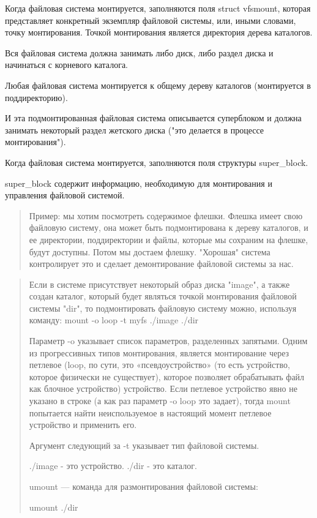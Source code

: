 Когда файловая система монтируется, заполняются поля struct vfsmount, которая представляет конкретный экземпляр файловой системы, или, иными словами, точку монтирования. Точкой монтирования является директория дерева каталогов.

Вся файловая система должна занимать либо диск, либо раздел диска и начинаться с корневого каталога.

Любая файловая система монтируется к общему дереву каталогов (монтируется в поддиректорию).

И эта подмонтированная файловая система описывается суперблоком и должна занимать некоторый раздел жетского диска ("это делается в процессе монтирования").

Когда файловая система монтируется, заполняются поля структуры super\_block.

super\_block содержит информацию, необходимую для монтирования и управления файловой системой.

\begin{quote}
Пример: мы хотим посмотреть содержимое флешки. Флешка имеет свою файловую систему, она может быть подмонтирована к дереву каталогов, и ее директории, поддиректории и файлы, которые мы сохраним на флешке, будут доступны. Потом мы достаем флешку. "Хорошая" система контролирует это и сделает демонтирование файловой системы за нас.
\end{quote}

\begin{quote}
Если в системе присутствует некоторый образ диска "image", а также создан каталог, который будет являться точкой монтирования файловой системы "dir", то подмонтировать файловую систему можно, используя команду: mount -o loop -t myfs ./image ./dir

Параметр -o указывает список параметров, разделенных запятыми. Одним из прогрессивных типов монтирования, является монтирование через петлевое (loop, по сути, это «псевдоустройство» (то есть устройство, которое физически не существует), которое позволяет обрабатывать файл как блочное устройство) устройство. Если петлевое устройство явно не указано в строке (а как раз параметр -o loop это задает), тогда mount попытается найти неиспользуемое в настоящий момент петлевое устройство и применить его.

Аргумент следующий за -t указывает тип файловой системы.

./image - это устройство. ./dir - это каталог.

umount — команда для размонтирования файловой системы:

umount ./dir
\end{quote}

